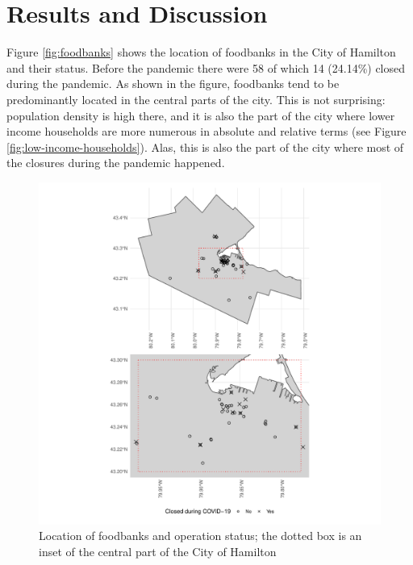 \documentclass[]{elsarticle} %
\begin{document}
\hypertarget{results-and-discussion}{%
\section{Results and Discussion}\label{results-and-discussion}}

Figure \ref{fig:foodbanks} shows the location of foodbanks in the City
of Hamilton and their status. Before the pandemic there were 58 of which
14 (24.14\%) closed during the pandemic. As shown in the figure,
foodbanks tend to be predominantly located in the central parts of the
city. This is not surprising: population density is high there, and it
is also the part of the city where lower income households are more
numerous in absolute and relative terms (see Figure
\ref{fig:low-income-households}). Alas, this is also the part of the
city where most of the closures during the pandemic happened.

\begin{figure}
\includegraphics[width=1\linewidth]{Accessibility-Foodbanks-Hamilton_files/figure-latex/plot-location-foodbanks-1} \caption{\label{fig:foodbanks}Location of foodbanks and operation status; the dotted box is an inset of the central part of the City of Hamilton}\label{fig:plot-location-foodbanks}
\end{figure}
\end{document}
